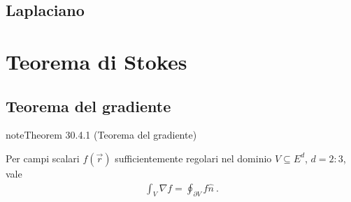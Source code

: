 \documentclass[letterpaper,10pt,italian]{jupyterBook}
\begin{document}
\subsection{Laplaciano}
\label{\detokenize{ch/vector-calculus/derivatives:laplaciano}}\label{\detokenize{ch/vector-calculus/derivatives:vector-calculus-derivatives-laplacian}}
\sphinxstepscope


\section{Teorema di Stokes}
\label{\detokenize{ch/vector-calculus/stokes:teorema-di-stokes}}\label{\detokenize{ch/vector-calculus/stokes:vector-calculus-stokes}}\label{\detokenize{ch/vector-calculus/stokes::doc}}

\subsection{Teorema del gradiente}
\label{\detokenize{ch/vector-calculus/stokes:teorema-del-gradiente}}\label{\detokenize{ch/vector-calculus/stokes:vector-calculus-stokes-gradient}}\label{ch/vector-calculus/stokes:thm-gradient}
\begin{sphinxadmonition}{note}{Theorem 30.4.1 (Teorema del gradiente)}



\sphinxAtStartPar
Per campi scalari \(f(\vec{r})\) sufficientemente regolari nel dominio \(V \subseteq E^d\), \(d=2:3\), vale
\begin{equation}\label{equation:ch/vector-calculus/stokes:eq:thm-gradient}
\begin{split}\int_{V} \nabla f = \oint_{\partial V} f \hat{n} \ .\end{split}
\end{equation}\end{sphinxadmonition}
\label{ch/vector-calculus/stokes:thm-gradient-1}
\end{document}
